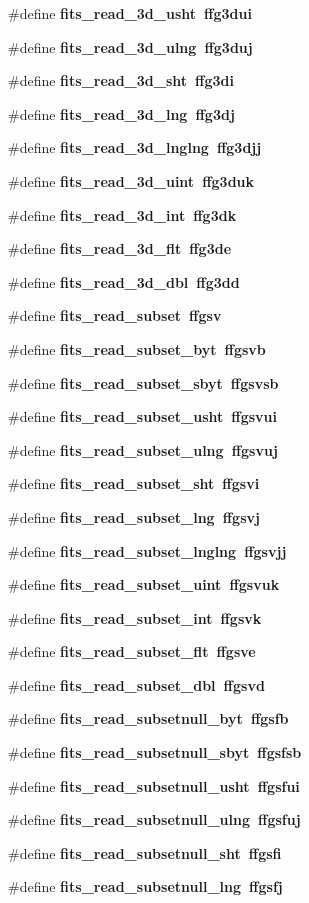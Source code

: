\begin{CompactItemize}
\#define \bf{fits\_\-read\_\-3d\_\-usht}~ffg3dui
\item 
\#define \bf{fits\_\-read\_\-3d\_\-ulng}~ffg3duj
\item 
\#define \bf{fits\_\-read\_\-3d\_\-sht}~ffg3di
\item 
\#define \bf{fits\_\-read\_\-3d\_\-lng}~ffg3dj
\item 
\#define \bf{fits\_\-read\_\-3d\_\-lnglng}~ffg3djj
\item 
\#define \bf{fits\_\-read\_\-3d\_\-uint}~ffg3duk
\item 
\#define \bf{fits\_\-read\_\-3d\_\-int}~ffg3dk
\item 
\#define \bf{fits\_\-read\_\-3d\_\-flt}~ffg3de
\item 
\#define \bf{fits\_\-read\_\-3d\_\-dbl}~ffg3dd
\item 
\#define \bf{fits\_\-read\_\-subset}~ffgsv
\item 
\#define \bf{fits\_\-read\_\-subset\_\-byt}~ffgsvb
\item 
\#define \bf{fits\_\-read\_\-subset\_\-sbyt}~ffgsvsb
\item 
\#define \bf{fits\_\-read\_\-subset\_\-usht}~ffgsvui
\item 
\#define \bf{fits\_\-read\_\-subset\_\-ulng}~ffgsvuj
\item 
\#define \bf{fits\_\-read\_\-subset\_\-sht}~ffgsvi
\item 
\#define \bf{fits\_\-read\_\-subset\_\-lng}~ffgsvj
\item 
\#define \bf{fits\_\-read\_\-subset\_\-lnglng}~ffgsvjj
\item 
\#define \bf{fits\_\-read\_\-subset\_\-uint}~ffgsvuk
\item 
\#define \bf{fits\_\-read\_\-subset\_\-int}~ffgsvk
\item 
\#define \bf{fits\_\-read\_\-subset\_\-flt}~ffgsve
\item 
\#define \bf{fits\_\-read\_\-subset\_\-dbl}~ffgsvd
\item 
\#define \bf{fits\_\-read\_\-subsetnull\_\-byt}~ffgsfb
\item 
\#define \bf{fits\_\-read\_\-subsetnull\_\-sbyt}~ffgsfsb
\item 
\#define \bf{fits\_\-read\_\-subsetnull\_\-usht}~ffgsfui
\item 
\#define \bf{fits\_\-read\_\-subsetnull\_\-ulng}~ffgsfuj
\item 
\#define \bf{fits\_\-read\_\-subsetnull\_\-sht}~ffgsfi
\item 
\#define \bf{fits\_\-read\_\-subsetnull\_\-lng}~ffgsfj

\end{CompactItemize}
